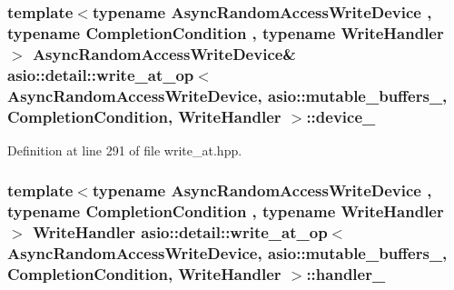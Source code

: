 \subsubsection[{device\+\_\+}]{\setlength{\rightskip}{0pt plus 5cm}template$<$typename Async\+Random\+Access\+Write\+Device , typename Completion\+Condition , typename Write\+Handler $>$ Async\+Random\+Access\+Write\+Device\& {\bf asio\+::detail\+::write\+\_\+at\+\_\+op}$<$ Async\+Random\+Access\+Write\+Device,                           {\bf asio\+::mutable\+\_\+buffers\+\_}, Completion\+Condition, Write\+Handler $>$\+::device\+\_\+}\label{classasio_1_1detail_1_1write__at__op_3_01_async_random_access_write_device_00_01_01_01_01_01_01_9c63ca7e3422e806874cb49cd5be5156_a59151894594dccd95071d7c3f9f0d6f7}


Definition at line 291 of file write\+\_\+at.\+hpp.

\hypertarget{classasio_1_1detail_1_1write__at__op_3_01_async_random_access_write_device_00_01_01_01_01_01_01_9c63ca7e3422e806874cb49cd5be5156_a138d294bd1ee398913e65e9745251f3b}{}
\subsubsection[{handler\+\_\+}]{\setlength{\rightskip}{0pt plus 5cm}template$<$typename Async\+Random\+Access\+Write\+Device , typename Completion\+Condition , typename Write\+Handler $>$ Write\+Handler {\bf asio\+::detail\+::write\+\_\+at\+\_\+op}$<$ Async\+Random\+Access\+Write\+Device,                           {\bf asio\+::mutable\+\_\+buffers\+\_}, Completion\+Condition, Write\+Handler $>$\+::handler\+\_\+}\label{classasio_1_1detail_1_1write__at__op_3_01_async_random_access_write_device_00_01_01_01_01_01_01_9c63ca7e3422e806874cb49cd5be5156_a138d294bd1ee398913e65e9745251f3b}


